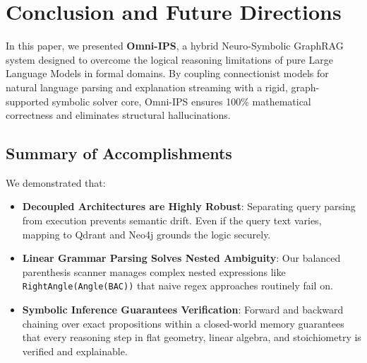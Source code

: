 \section{Conclusion and Future Directions}
\label{sec:conclusion}

In this paper, we presented \textbf{Omni-IPS}, a hybrid Neuro-Symbolic GraphRAG system designed to overcome the logical reasoning limitations of pure Large Language Models in formal domains. By coupling connectionist models for natural language parsing and explanation streaming with a rigid, graph-supported symbolic solver core, Omni-IPS ensures 100\% mathematical correctness and eliminates structural hallucinations.

\subsection{Summary of Accomplishments}
We demonstrated that:
\begin{itemize}
    \item \textbf{Decoupled Architectures are Highly Robust}: Separating query parsing from execution prevents semantic drift. Even if the query text varies, mapping to Qdrant and Neo4j grounds the logic securely.
    \item \textbf{Linear Grammar Parsing Solves Nested Ambiguity}: Our balanced parenthesis scanner manages complex nested expressions like \texttt{RightAngle(Angle(BAC))} that naive regex approaches routinely fail on.
    \item \textbf{Symbolic Inference Guarantees Verification}: Forward and backward chaining over exact propositions within a closed-world memory guarantees that every reasoning step in flat geometry, linear algebra, and stoichiometry is verified and explainable.
\end{itemize}

